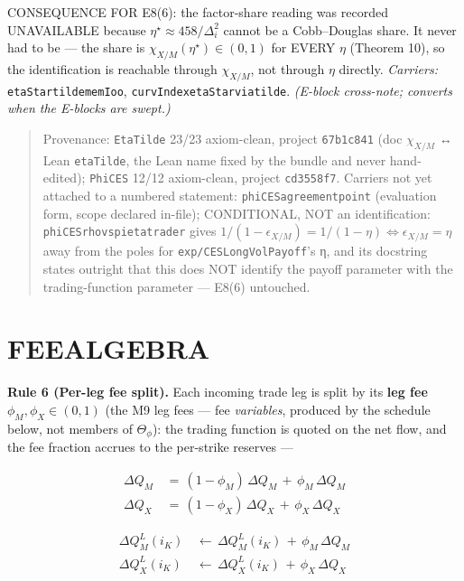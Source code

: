 \documentclass[11pt]{article}
\renewcommand{\_}{\textunderscore\allowbreak}
\begin{document}
CONSEQUENCE FOR E8(6): the factor-share reading was recorded UNAVAILABLE because \(\eta^{\star} \approx 458/\Delta_i^{2}\) cannot be a Cobb--Douglas share. It never had to be --- the share is \(\chi_{X/M}(\eta^{\star}) \in (0,1)\) for EVERY \(\eta\) (Theorem 10), so the identification is reachable through \(\chi_{X/M}\), not through \(\eta\) directly. \emph{Carriers:} \texttt{etaStar\_tilde\_mem\_Ioo}, \texttt{curvIndex\_etaStar\_via\_tilde}. \emph{(E-block cross-note; converts when the E-blocks are swept.)}

\begin{quote}
Provenance: \texttt{EtaTilde} 23/23 axiom-clean, project \texttt{67b1c841} (doc \(\chi_{X/M}\) ↔ Lean \texttt{etaTilde}, the Lean name fixed by the bundle and never hand-edited); \texttt{PhiCES} 12/12 axiom-clean, project \texttt{cd3558f7}. Carriers not yet attached to a numbered statement: \texttt{phiCES\_agreement\_point} (evaluation form, scope declared in-file); CONDITIONAL, NOT an identification: \texttt{phiCES\_rho\_vs\_pi\_eta\_trader} gives \(1/(1-\epsilon_{X/M}) = 1/(1-\eta) \iff \epsilon_{X/M} = \eta\) away from the poles for \texttt{exp/CESLongVolPayoff}'s η, and its docstring states outright that this does NOT identify the payoff parameter with the trading-function parameter --- E8(6) untouched.
\end{quote}

\section*{FEE\_ALGEBRA}\label{fee_algebra}

\textbf{Rule 6 (Per-leg fee split).} Each incoming trade leg is split by its \textbf{leg fee} \(\phi_M, \phi_X \in (0,1)\) (the M9 leg fees --- fee \emph{variables}, produced by the schedule below, not members of \(\Theta_{\phi}\)): the trading function is quoted on the net flow, and the fee fraction accrues to the per-strike reserves ---

\[
    \begin{aligned}
        \Delta Q_M \, &= \, (1 - \phi_M) \, \Delta Q_M \, + \, \phi_M \, \Delta Q_M \\
        \Delta Q_X \, &= \, (1 - \phi_X)\, \Delta Q_X \, + \, \phi_X \, \Delta Q_X
    \end{aligned}
\]

\[
    \begin{aligned}
        \Delta Q_M^{L} (i_K) \, &\leftarrow \, \Delta Q_M^{L} (i_K) \, + \, \phi_M \, \Delta Q_M \\
        \Delta Q_X^{L} (i_K) \, &\leftarrow \, \Delta Q_X^{L} (i_K) \, + \, \phi_X \, \Delta Q_X
    \end{aligned}
\]
\end{document}
